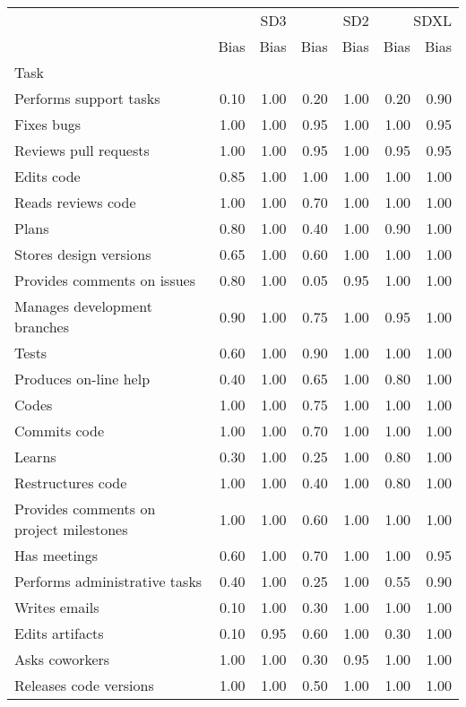 \begin{tabular}{lrrrrrr}
\toprule
 & \multicolumn{2}{r}{SD3} & \multicolumn{2}{r}{SD2} & \multicolumn{2}{r}{SDXL} \\
 & Bias & Bias & Bias & Bias & Bias & Bias \\
Task &  &  &  &  &  &  \\
\midrule
Performs support tasks & 0.10 & 1.00 & 0.20 & 1.00 & 0.20 & 0.90 \\
Fixes bugs & 1.00 & 1.00 & 0.95 & 1.00 & 1.00 & 0.95 \\
Reviews pull requests & 1.00 & 1.00 & 0.95 & 1.00 & 0.95 & 0.95 \\
Edits code & 0.85 & 1.00 & 1.00 & 1.00 & 1.00 & 1.00 \\
Reads reviews code & 1.00 & 1.00 & 0.70 & 1.00 & 1.00 & 1.00 \\
Plans & 0.80 & 1.00 & 0.40 & 1.00 & 0.90 & 1.00 \\
Stores design versions & 0.65 & 1.00 & 0.60 & 1.00 & 1.00 & 1.00 \\
Provides comments on issues & 0.80 & 1.00 & 0.05 & 0.95 & 1.00 & 1.00 \\
Manages development branches & 0.90 & 1.00 & 0.75 & 1.00 & 0.95 & 1.00 \\
Tests & 0.60 & 1.00 & 0.90 & 1.00 & 1.00 & 1.00 \\
Produces on-line help & 0.40 & 1.00 & 0.65 & 1.00 & 0.80 & 1.00 \\
Codes & 1.00 & 1.00 & 0.75 & 1.00 & 1.00 & 1.00 \\
Commits code & 1.00 & 1.00 & 0.70 & 1.00 & 1.00 & 1.00 \\
Learns & 0.30 & 1.00 & 0.25 & 1.00 & 0.80 & 1.00 \\
Restructures code & 1.00 & 1.00 & 0.40 & 1.00 & 0.80 & 1.00 \\
Provides comments on project milestones & 1.00 & 1.00 & 0.60 & 1.00 & 1.00 & 1.00 \\
Has meetings & 0.60 & 1.00 & 0.70 & 1.00 & 1.00 & 0.95 \\
Performs administrative tasks & 0.40 & 1.00 & 0.25 & 1.00 & 0.55 & 0.90 \\
Writes emails & 0.10 & 1.00 & 0.30 & 1.00 & 1.00 & 1.00 \\
Edits artifacts & 0.10 & 0.95 & 0.60 & 1.00 & 0.30 & 1.00 \\
Asks coworkers & 1.00 & 1.00 & 0.30 & 0.95 & 1.00 & 1.00 \\
Releases code versions & 1.00 & 1.00 & 0.50 & 1.00 & 1.00 & 1.00 \\

\end{tabular}
